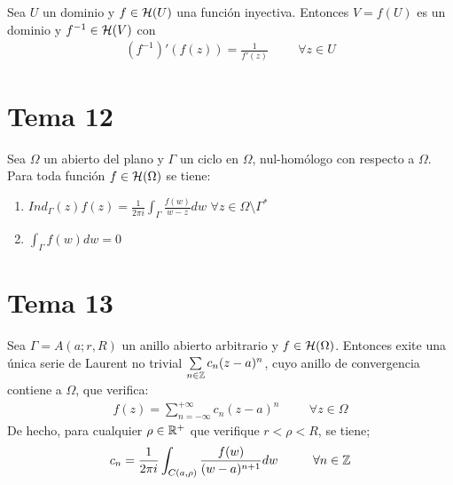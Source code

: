 \documentclass[12pt]{article}
\begin{document}
    \begin{teo} Sea $U$ un dominio y $f\in \mathcal{H}(U)$ una función inyectiva. Entonces $V=f(U)$ es un dominio y $f^{-1}\in \mathcal{H}(V)$ con 
    \begin{gather*}
        (f^{-1})'(f(z)) = \frac{1}{f'(z)} \hspace{1cm} \forall z \in U
    \end{gather*}
    \end{teo}

    \section{Tema 12}

    \begin{teo} Sea $\Omega$ un abierto del plano y $\Gamma$ un ciclo en $\Omega$, nul-homólogo con respecto a $\Omega$. Para toda función $f\in \mathcal{H}(\Omega)$ se tiene:
    \begin{enumerate}
        \item $\displaystyle Ind_\Gamma (z)f(z) = \frac{1}{2\pi i} \int_\Gamma \frac{f(w)}{w-z} dw$ \hspace{1cm} $\forall z \in \Omega \setminus \Gamma^*$
        \item $\displaystyle \int_\Gamma f(w) dw = 0$
    \end{enumerate}
    \end{teo}

    \section{Tema 13}

    \begin{teo} Sea $\Gamma = A(a;r,R)$ un anillo abierto arbitrario y $f\in \mathcal{H}(\Omega)$. Entonces exite una única serie de Laurent no trivial $\sum\limits_{n \in \mathbb{Z}}c_n(z-a)^n$, cuyo anillo de convergencia contiene a $\Omega$, que verifica:
    \begin{gather*}
        f(z) = \sum\limits_{n=-\infty}^{+\infty} c_n(z-a)^n \hspace{1cm} \forall z \in \Omega
    \end{gather*}
    De hecho, para cualquier $\rho\in \mathbb{R}^+$ que verifique $r < \rho < R$, se tiene;
    \begin{gather*}
        c_n = \frac{1}{2\pi i} \int_{C(a, \rho)} \frac{f(w)}{(w-a)^{n+1}}dw \hspace{1cm} \forall n \in \mathbb{Z}
    \end{gather*}
    \end{teo}
\end{document}
